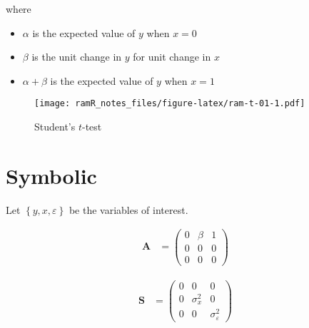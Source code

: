 \documentclass[
]{book}
\providecommand{\tightlist}{%
  \setlength{\itemsep}{0pt}\setlength{\parskip}{0pt}}
\theoremstyle{definition}
\theoremstyle{definition}
\theoremstyle{definition}
\theoremstyle{remark}
\begin{document}
\noindent where

\begin{itemize}
\tightlist
\item
  \(\alpha\) is the expected value of \(y\) when \(x = 0\)
\item
  \(\beta\) is the unit change in \(y\) for unit change in \(x\)
\item
  \(\alpha + \beta\) is the expected value of \(y\) when \(x = 1\)
\end{itemize}

\begin{figure}
\centering
\texttt{[image: ramR\_notes\_files/figure-latex/ram-t-01-1.pdf]}
\caption{\label{fig:ram-t-01}Student's \(t\)-test}
\end{figure}

\hypertarget{symbolic}{%
\section{Symbolic}\label{symbolic}}

Let \(\left\{ y, x, \varepsilon \right\}\) be the variables of interest.

\begin{align*}\mathbf{A} &=\left( \begin{array}{ccc} 0 & \beta  & 1 \\ 0 & 0 & 0 \\ 0 & 0 & 0 \end{array} \right)\end{align*}

\begin{align*}\mathbf{S} &=\left( \begin{array}{ccc} 0 & 0 & 0 \\ 0 & \sigma  _{x} ^{2} & 0 \\ 0 & 0 & \sigma  _{\varepsilon } ^{2} \end{array} \right)\end{align*}
\end{document}

